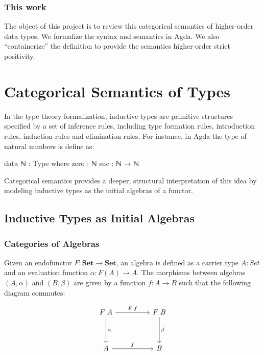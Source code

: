 \subsubsection*{This work}

The object of this project is to review this categorical semantics of higher-order data types. We formalize the syntax and semantics in Agda. We also ``containerize'' the definition to provide the semantics higher-order strict positivity.

\section{Categorical Semantics of Types}

In the type theory formalization, inductive types are primitive structures specified by a set of inference rules, including type formation rules, introduction rules, induction rules and elimination rules\cite{rijke2022introduction}. For instance, in Agda the type of natural numbers is define as:

\begin{code}
data ℕ : Type where
  zero : ℕ
  suc : ℕ → ℕ 
\end{code}

Categorical semantics provides a deeper, structural interpretation of this idea by modeling inductive types as the initial algebras of a functor.

\subsection{Inductive Types as Initial Algebras}

\subsubsection*{Categories of Algebras}

Given an endofunctor $F : \textbf{Set} \to \textbf{Set}$, an algebra is defined as a carrier type $A : Set$ and an evaluation function $\alpha : F(A) \to A$. The morphisms between algebras $(A,\alpha)$ and $(B,\beta)$ are given by a function $f : A \to B$ such that the following diagram commutes:

\[
\begin{tikzcd}[row sep=huge, column sep=huge]
  F\;A \arrow[r, "F\;f"] \arrow[d, "\alpha"]
  & F\;B \arrow[d, "\beta"] \\
  A \arrow[r, "f"]
  & B
\end{tikzcd}
\]

